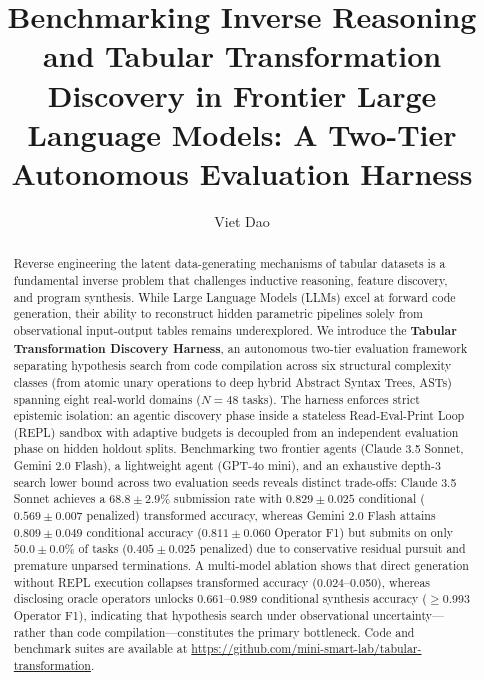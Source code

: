 \documentclass[sigconf]{acmart}
\begin{document}
\title[Benchmarking Inverse Reasoning and Tabular Transformation Discovery in Frontier LLMs]{Benchmarking Inverse Reasoning and Tabular Transformation Discovery in Frontier Large Language Models: A Two-Tier Autonomous Evaluation Harness}

\author{Viet Dao}

\begin{abstract}
Reverse engineering the latent data-generating mechanisms of tabular datasets is a fundamental inverse problem that challenges inductive reasoning, feature discovery, and program synthesis. While Large Language Models (LLMs) excel at forward code generation, their ability to reconstruct hidden parametric pipelines solely from observational input-output tables remains underexplored. We introduce the \textbf{Tabular Transformation Discovery Harness}, an autonomous two-tier evaluation framework separating hypothesis search from code compilation across six structural complexity classes (from atomic unary operations to deep hybrid Abstract Syntax Trees, ASTs) spanning eight real-world domains ($N=48$ tasks). The harness enforces strict epistemic isolation: an agentic discovery phase inside a stateless Read-Eval-Print Loop (REPL) sandbox with adaptive budgets is decoupled from an independent evaluation phase on hidden holdout splits. Benchmarking two frontier agents (Claude 3.5 Sonnet, Gemini 2.0 Flash), a lightweight agent (GPT-4o mini), and an exhaustive depth-3 search lower bound across two evaluation seeds reveals distinct trade-offs: Claude 3.5 Sonnet achieves a $68.8 \pm 2.9\%$ submission rate with $0.829 \pm 0.025$ conditional ($0.569 \pm 0.007$ penalized) transformed accuracy, whereas Gemini 2.0 Flash attains $0.809 \pm 0.049$ conditional accuracy ($0.811 \pm 0.060$ Operator F1) but submits on only $50.0 \pm 0.0\%$ of tasks ($0.405 \pm 0.025$ penalized) due to conservative residual pursuit and premature unparsed terminations. A multi-model ablation shows that direct generation without REPL execution collapses transformed accuracy (0.024--0.050), whereas disclosing oracle operators unlocks 0.661--0.989 conditional synthesis accuracy ($\ge$0.993 Operator F1), indicating that hypothesis search under observational uncertainty—rather than code compilation—constitutes the primary bottleneck. Code and benchmark suites are available at \url{https://github.com/mini-smart-lab/tabular-transformation}.
\end{abstract}
\end{document}
